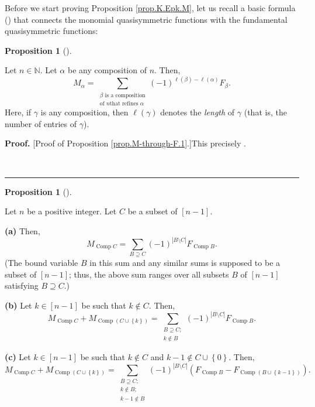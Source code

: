 \documentclass[numbers=enddot,12pt,final,onecolumn,notitlepage]{scrartcl}%
\theoremstyle{definition}
\newtheorem{prop}[theo]{Proposition}
\newenvironment{proposition}[1][]
{\begin{prop}[#1]\begin{leftbar}}
{\end{leftbar}\end{prop}}
\newenvironment{proof}[1][Proof]{\noindent\textbf{#1.} }{\ \rule{0.5em}{0.5em}}
\newenvironment{verlong}{}{}
\let\sumnonlimits\sum
\renewcommand{\sum}{\sumnonlimits\limits}
\begin{document}
\begin{verlong}
Before we start proving Proposition \ref{prop.K.Epk.M}, let us recall a basic
formula (\cite[(5.2.2)]{HopfComb}) that connects the monomial quasisymmetric
functions with the fundamental quasisymmetric functions:

\begin{proposition}
\label{prop.M-through-F.1}Let $n\in\mathbb{N}$. Let $\alpha$ be any
composition of $n$. Then,%
\[
M_{\alpha}=\sum_{\substack{\beta\text{ is a composition}\\\text{of }n\text{
that refines }\alpha}}\left(  -1\right)  ^{\ell\left(  \beta\right)
-\ell\left(  \alpha\right)  }F_{\beta}.
\]
Here, if $\gamma$ is any composition, then $\ell\left(  \gamma\right)  $
denotes the \textit{length} of $\gamma$ (that is, the number of entries of
$\gamma$).
\end{proposition}

\begin{proof}
[Proof of Proposition \ref{prop.M-through-F.1}.]This precisely \cite[(5.2.2)]%
{HopfComb}.

\end{proof}

\begin{proposition}
\label{prop.M-through-F.2}Let $n$ be a positive integer. Let $C$ be a subset
of $\left[  n-1\right]  $.

\textbf{(a)} Then,%
\[
M_{\operatorname*{Comp}C}=\sum_{B\supseteq C}\left(  -1\right)  ^{\left\vert
B\setminus C\right\vert }F_{\operatorname*{Comp}B}.
\]
(The bound variable $B$ in this sum and any similar sums is supposed to be a
subset of $\left[  n-1\right]  $; thus, the above sum ranges over all subsets
$B$ of $\left[  n-1\right]  $ satisfying $B\supseteq C$.)

\textbf{(b)} Let $k\in\left[  n-1\right]  $ be such that $k\notin C$. Then,%
\[
M_{\operatorname*{Comp}C}+M_{\operatorname*{Comp}\left(  C\cup\left\{
k\right\}  \right)  }=\sum_{\substack{B\supseteq C;\\k\notin B}}\left(
-1\right)  ^{\left\vert B\setminus C\right\vert }F_{\operatorname*{Comp}B}.
\]


\textbf{(c)} Let $k\in\left[  n-1\right]  $ be such that $k\notin C$ and
$k-1\notin C\cup\left\{  0\right\}  $. Then,%
\[
M_{\operatorname*{Comp}C}+M_{\operatorname*{Comp}\left(  C\cup\left\{
k\right\}  \right)  }=\sum_{\substack{B\supseteq C;\\k\notin B;\\k-1\notin
B}}\left(  -1\right)  ^{\left\vert B\setminus C\right\vert }\left(
F_{\operatorname*{Comp}B}-F_{\operatorname*{Comp}\left(  B\cup\left\{
k-1\right\}  \right)  }\right)  .
\]


\end{proposition}
\end{verlong}
\end{document}
